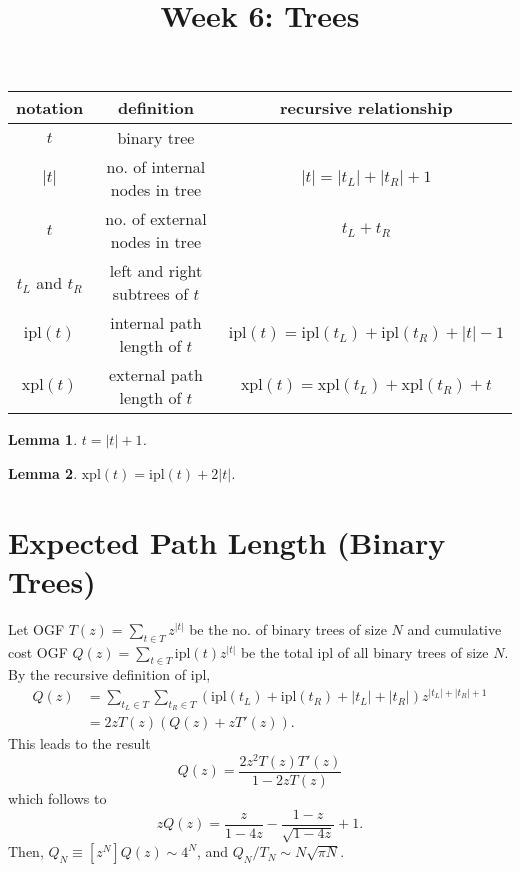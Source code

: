 \documentclass{article}
\newtheorem{lemma}{Lemma}
\begin{document}
\title{Week 6: Trees}
\maketitle

\begin{tabular}{c c c}
  notation & definition & recursive relationship \\
  \hline
  $t$ & binary tree \\
  $|t|$ & no. of internal nodes in tree
    & $|t| = |t_L| + |t_R| + 1$ \\
  $\boxed{t}$ & no. of external nodes in tree
    & $\boxed{t_L} + \boxed{t_R}$ \\
  $t_L$ and $t_R$ & left and right subtrees of $t$
    & \\
  $\mathrm{ipl}(t)$ & internal path length of $t$
    & $\mathrm{ipl}(t) = \mathrm{ipl}(t_L) + \mathrm{ipl}(t_R) + |t| - 1$ \\
  $\mathrm{xpl}(t)$ & external path length of $t$
    & $\mathrm{xpl}(t) = \mathrm{xpl}(t_L) + \mathrm{xpl}(t_R) + \boxed{t}$
\end{tabular}

\begin{lemma}$\boxed{t} = |t| + 1$.\end{lemma}
\begin{lemma}$\mathrm{xpl}(t) = \mathrm{ipl}(t) + 2|t|$.\end{lemma}

\section{Expected Path Length (Binary Trees)}

Let OGF $T(z) = \sum_{t \in T} z^{|t|}$ be the no. of binary trees of size
$N$ and cumulative cost OGF $Q(z) = \sum_{t \in T} \mathrm{ipl}(t)z^{|t|}$ be
the total ipl of all binary trees of size $N$. By the recursive definition of
ipl, \begin{align*}
  Q(z) &= \sum_{t_L \in T} \sum_{t_R \in T} (\mathrm{ipl}(t_L) +
  \mathrm{ipl}(t_R) + |t_L| + |t_R|)z^{|t_L| + |t_R| + 1} \\
       &= 2zT(z)(Q(z) + zT'(z)).
\end{align*} This leads to the result \begin{equation*}
  Q(z) = \frac{2z^2T(z)T'(z)}{1 - 2zT(z)}
\end{equation*} which follows to \begin{equation*}
  zQ(z) = \frac{z}{1 - 4z} - \frac{1 - z}{\sqrt{1 - 4z}} + 1.
\end{equation*} Then, $Q_N \equiv [z^N]Q(z) \sim 4^N$, and $Q_N/T_N \sim
N\sqrt{\pi N}$.
\end{document}
